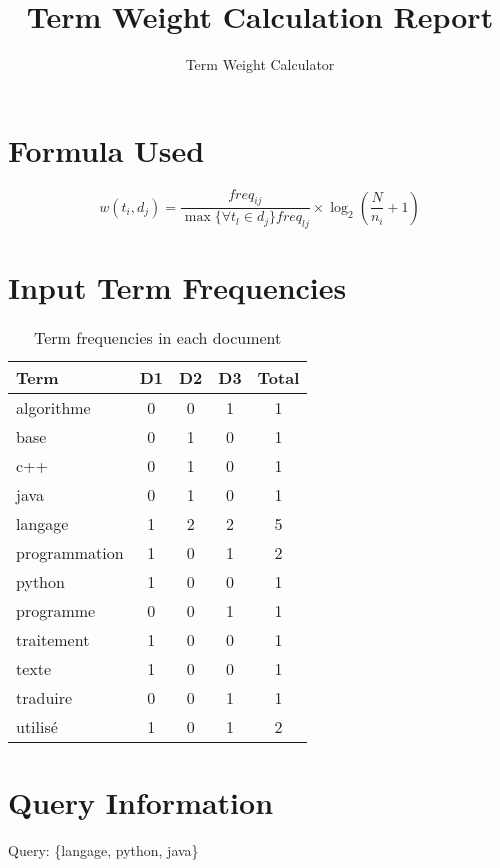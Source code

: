 \documentclass{article}
\begin{document}
\title{Term Weight Calculation Report}
\author{Term Weight Calculator}
\maketitle

\section{Formula Used}
\begin{equation}
w(t_i, d_j) = \frac{freq_{ij}}{\max\{\forall t_l \in d_j\} freq_{lj}} \times \log_{2}\left(\frac{N}{n_i} + 1\right)
\end{equation}

\section{Input Term Frequencies}
\begin{table}[h]
\centering
\begin{tabular}{lcccc}
\toprule
Term & D1 & D2 & D3 & Total \\
\midrule
algorithme & 0 & 0 & 1 & 1 \\
base & 0 & 1 & 0 & 1 \\
c++ & 0 & 1 & 0 & 1 \\
java & 0 & 1 & 0 & 1 \\
langage & 1 & 2 & 2 & 5 \\
programmation & 1 & 0 & 1 & 2 \\
python & 1 & 0 & 0 & 1 \\
programme & 0 & 0 & 1 & 1 \\
traitement & 1 & 0 & 0 & 1 \\
texte & 1 & 0 & 0 & 1 \\
traduire & 0 & 0 & 1 & 1 \\
utilis\'{e} & 1 & 0 & 1 & 2 \\
\bottomrule
\end{tabular}
\caption{Term frequencies in each document}
\end{table}

\section{Query Information}
Query: \{langage, python, java\}
\end{document}
